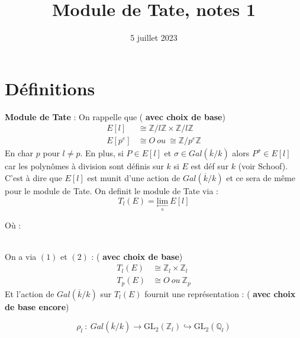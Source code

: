 \documentclass[12pt]{article}
\title{Module de Tate, notes 1}
\date{5 juillet 2023}
\begin{document}
\tableofcontents
\maketitle
\section{Définitions}
\indent \indent \textbf{\color{wgrey} Module de Tate} : On rappelle que (\textbf{\color{wgrey} avec choix de base})
\begin{align}
    E[l]&\cong \mathbb{Z}/l\mathbb{Z}\times\mathbb{Z}/l\mathbb{Z} \\
    E[p^e]&\cong {O}~ou~\cong \mathbb{Z}/p^e\mathbb{Z}
\end{align}
En char $p$ pour $l\ne p$. En plus, si $P\in E[l]$ et $\sigma\in Gal(\overline{k}/k)$
alors $P^{\sigma}\in E[l]$ car les polynômes à division sont définis sur $k$ si $E$ est déf sur $k$ (voir Schoof).
C'est à dire que $E[l]$ est munit d'une action de $Gal(\overline{k}/k)$ et ce sera de même pour le module de Tate.
On definit le module de Tate via : $$T_l(E)=\underset{\underset{n}{\longleftarrow}}{\textrm{lim}}~E[l]$$

Où :\\\newline
\indent \indent {}
\\ On a via $(1)$ et $(2)$ : (\textbf{\color{wgrey} avec choix de base})
\begin{align}
   T_l(E) &\cong \mathbb{Z}_l\times\mathbb{Z}_l\\
   T_p(E) &\cong O~ou~\mathbb{Z}_p
\end{align}
Et l'action de $Gal(\overline{k}/k)$ sur $T_l(E)$ fournit une représentation : (\textbf{\color{wgrey} avec choix de base encore})

$$\rho_l~:~Gal(\overline{k}/k)\rightarrow \textrm{GL}_2(\mathbb{Z}_l)\hookrightarrow \textrm{GL}_2(\mathbb{Q}_l)$$
\end{document}
